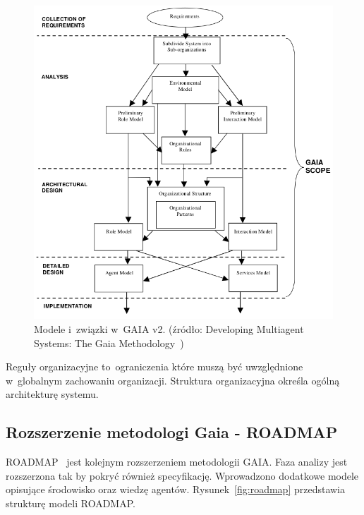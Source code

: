 \documentclass[11pt]{report}
\begin{document}
    \begin{figure}[!ht]
        \centering
        \includegraphics[width=\linewidth]{fig/gaia2 models.png}
        \caption{Modele i~związki w~GAIA v2. (źródło: Developing Multiagent Systems: The Gaia Methodology~\cite{Zambonelli2003})}
        \label{fig:gaia_v2}
    \end{figure}

    Reguły organizacyjne to~ograniczenia które muszą być uwzględnione w~globalnym zachowaniu organizacji.
    Struktura organizacyjna określa ogólną architekturę systemu.

    \subsection{Rozszerzenie metodologi Gaia - ROADMAP}
    ROADMAP~\cite{Juan2002a} jest kolejnym rozszerzeniem metodologii GAIA\@.
    Faza analizy jest rozszerzona tak by pokryć również specyfikację.
    Wprowadzono dodatkowe modele opisujące środowisko oraz wiedzę agentów.
    Rysunek~\ref{fig:roadmap} przedstawia strukturę modeli ROADMAP\@.
\end{document}
